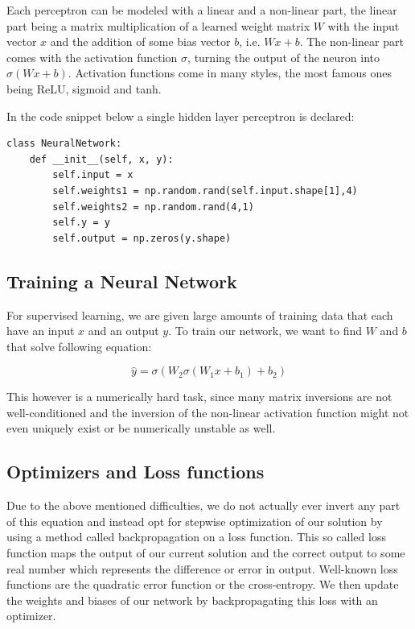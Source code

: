 \documentclass[parskip=half,notes,cadrem,toolver]{iisvlsi}
\begin{document}
Each perceptron can be modeled with a linear and a non-linear part, the linear part being a matrix multiplication of a learned weight matrix $W$ with the input vector $x$ and the addition of some bias vector $b$, i.e. $Wx+b$. The non-linear part comes with the activation function $\sigma$, turning the output of the neuron into $\sigma(Wx+b)$. Activation functions come in many styles, the most famous ones being ReLU, sigmoid and tanh.

\ifx
In the code snippet below a single hidden layer perceptron is declared:

\begin{lstlisting}
class NeuralNetwork:
    def __init__(self, x, y):
        self.input = x
        self.weights1 = np.random.rand(self.input.shape[1],4)
        self.weights2 = np.random.rand(4,1)
        self.y = y
        self.output = np.zeros(y.shape)
\end{lstlisting}
\fi

\subsection{Training a Neural Network}

For supervised learning, we are given large amounts of training data that each have an input $x$ and an output $y$. To train our network, we want to find $W$ and $b$ that solve following equation:

$$ \hat{y} = \sigma (W_2 \sigma (W_1 x + b_1) + b_2) $$

This however is a numerically hard task, since many matrix inversions are not well-conditioned and the inversion of the non-linear activation function might not even uniquely exist or be numerically unstable as well.

\subsection{Optimizers and Loss functions}

Due to the above mentioned difficulties, we do not actually ever invert any part of this equation and instead opt for stepwise optimization of our solution by using a method called backpropagation on a loss function. This so called loss function maps the output of our current solution and the correct output to some real number which represents the difference or error in output. Well-known loss functions are the quadratic error function or the cross-entropy. We then update the weights and biases of our network by backpropagating this loss with an optimizer.
\end{document}
